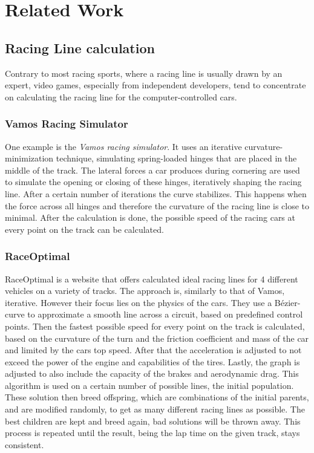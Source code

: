 \section{Related Work}
\label{sec:related_work}

\subsection{Racing Line calculation}
Contrary to most racing sports, where a racing line is usually drawn by an expert, video games, especially from independent developers, tend to concentrate on calculating the racing line for the computer-controlled cars.

\subsubsection{Vamos Racing Simulator}
One example is the \textit{Vamos racing simulator}. It uses an iterative cur\-va\-ture-min\-i\-mi\-za\-tion technique, simulating spring-loaded hinges that are placed in the middle of the track. The lateral forces a car produces during cornering are used to simulate the opening or closing of these hinges, iteratively shaping the racing line. After a certain number of iterations the curve stabilizes. This happens when the force across all hinges and therefore the curvature of the racing line is close to minimal. After the calculation is done, the possible speed of the racing cars at every point on the track can be calculated. 

\subsubsection{RaceOptimal}
RaceOptimal is a website that offers calculated ideal racing lines for 4 different vehicles on a variety of tracks. The approach is, similarly to that of Vamos, iterative. However their focus lies on the physics of the cars. They use a Bézier-curve to approximate a smooth line across a circuit, based on predefined control points. Then the fastest possible speed for every point on the track is calculated, based on the curvature of the turn and the friction coefficient and mass of the car and limited by the cars top speed. After that the acceleration is adjusted to not exceed the power of the engine and capabilities of the tires. Lastly, the graph is adjusted to also include the capacity of the brakes and aerodynamic drag. 
This algorithm is used on a certain number of possible lines, the initial population. These solution then breed offspring, which are combinations of the initial parents, and are modified randomly, to get as many different racing lines as possible.
The best children are kept and breed again, bad solutions will be thrown away. This process is repeated until the result, being the lap time on the given track, stays consistent.

\clearpage